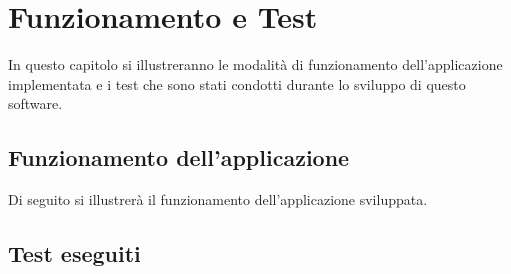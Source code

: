 \def \ti{\textit}
\def \bf{\textbf}

\chapter{Funzionamento e Test}
	\label{cap:test}
	
In questo capitolo si illustreranno le modalità di funzionamento dell'applicazione implementata e i test che sono stati condotti durante lo sviluppo di questo software. %

\section{Funzionamento dell'applicazione}
	\label{sec:funzionamento}
Di seguito si illustrerà il funzionamento dell'applicazione sviluppata. %

\section{Test eseguiti}
	\label{sec:esperimenti}
